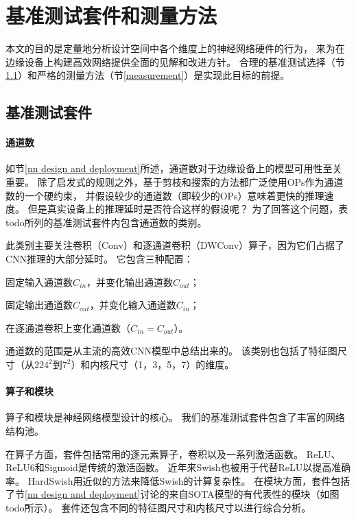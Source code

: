 \section{基准测试套件和测量方法}
\label{methodology}
本文的目的是定量地分析设计空间中各个维度上的神经网络硬件的行为，
来为在边缘设备上构建高效网络提供全面的见解和改进方针。
合理的基准测试选择（节\ref{suite}）和严格的测量方法（节\ref{measurement}）是实现此目标的前提。

\subsection{基准测试套件}
\label{suite}

\paragraph{通道数}
如节\ref{nn design and deployment}所述，通道数对于边缘设备上的模型可用性至关重要。
除了启发式的规则之外，基于剪枝和搜索的方法都广泛使用OPs作为通道数的一个硬约束，
并假设较少的通道数（即较少的OPs）意味着更快的推理速度。
但是真实设备上的推理延时是否符合这样的假设呢？
为了回答这个问题，表todo所列的基准测试套件内包含通道数的类别。

此类别主要关注卷积（Conv）和逐通道卷积（DWConv）算子，因为它们占据了CNN推理的大部分延时。
它包含三种配置：
\begin{enumerate*}[label=(\alph*)]
    \item 固定输入通道数$C_{in}$，并变化输出通道数$C_{out}$；
    \item 固定输出通道数$C_{out}$，并变化输入通道数$C_{in}$；
    \item 在逐通道卷积上变化通道数（$C_{in}=C_{out}$）。
\end{enumerate*}
通道数的范围是从主流的高效CNN模型中总结出来的。
该类别也包括了特征图尺寸（从$224^2$到$7^2$）和内核尺寸（1，3，5，7）的维度。

\paragraph{算子和模块}
算子和模块是神经网络模型设计的核心。
我们的基准测试套件包含了丰富的网络结构池。

在算子方面，套件包括常用的逐元素算子，卷积以及一系列激活函数。
ReLU、ReLU6和Sigmoid是传统的激活函数。
近年来Swish\cite{ramachandran2017swish}也被用于代替ReLU以提高准确率。
HardSwish用近似的方法来降低Swish的计算复杂性。
在模块方面，套件包括了节\ref{nn design and deployment}讨论的来自SOTA模型的有代表性的模块（如图todo所示）。
套件还包含不同的特征图尺寸和内核尺寸以进行综合分析。

